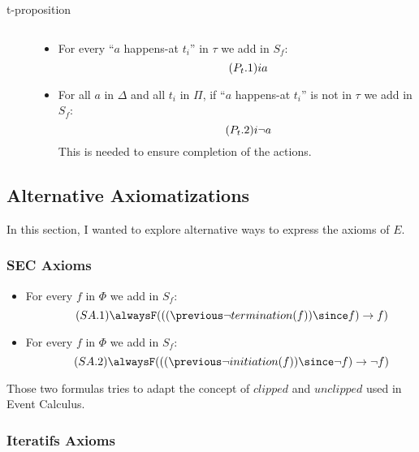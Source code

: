\begin{description}
\begin{itemize}
\begin{equation}
    \end{equation}
  \end{itemize}
  \item[t-proposition] $ $
  \begin{itemize}
    \item For every “$a$ happens-at $t_i$” in $\tau$ we add in $S_f$:
    \begin{equation}\tag{$P_t.1$}
      \next^{i}a
    \end{equation}\label{sec:trans_def_ltl}
    \item For all $a$ in $\Delta$ and all $t_i$ in $\Pi$, if “$a$ happens-at $t_i$” is not in $\tau$ we add in $S_f$:
    \begin{equation}\tag{$P_t.2$}
      \next^{i}\neg a
    \end{equation}
      This is needed to ensure completion of the actions.
  \end{itemize}
\end{description}

\subsection{Alternative Axiomatizations}

In this section, I wanted to explore alternative ways to express the axioms of $E$.

\subsubsection{SEC Axioms}\label{sec:sec}

\begin{itemize}
  \item
    For every $f$ in $\Phi$ we add in $S_f$:
    \begin{equation}\tag{$SA.1$}
      \alwaysF(((\previous \neg termination(f)) \since f) \rightarrow f)
    \end{equation}
  \item
    For every $f$ in $\Phi$ we add in $S_f$:
    \begin{equation}\tag{$SA.2$}
      \alwaysF(((\previous \neg initiation(f)) \since \neg f) \rightarrow \neg f)
    \end{equation}
\end{itemize}

Those two formulas tries to adapt the concept of $clipped$ and $unclipped$ used in Event Calculus.

\subsubsection{Iteratifs Axioms}

